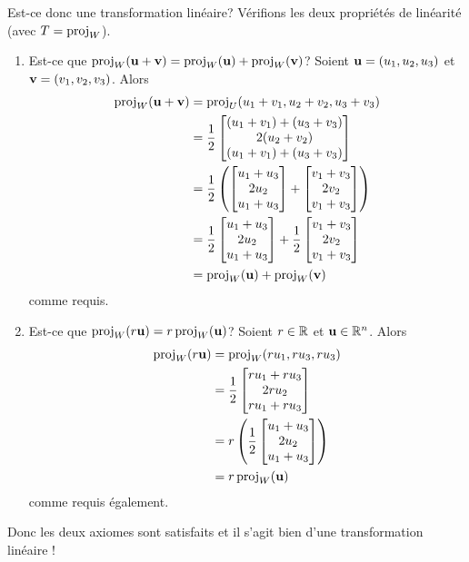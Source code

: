 \begin{myexample}
Est-ce donc une transformation linéaire?  Vérifions les deux propriétés de
linéarité (avec $T = \proj_W$).
\begin{enumerate}
\item Est-ce que $\proj_W(\uu + \vv) = \proj_W(\uu) + \proj_W(\vv)$? Soient $\uu = (u_1, u_2, u_3)$ et $\vv = (v_1, v_2, v_3)$. Alors
\begin{align*}
\proj_W(\uu + \vv) &= \proj_U(u_1+v_1,u_2+v_2,u_3+v_3) \\
&= \frac12\mat{ (u_1+v_1) + (u_3+v_3)\\ 2(u_2+v_2)\\  (u_1+v_1) + (u_3+v_3)}\\
&= \frac12\left( \mat{u_1+u_3\\2u_2\\u_1+u_3} + \mat{v_1+v_3\\2v_2\\v_1+v_3}\right) \\
&= \frac12\mat{u_1+u_3\\2u_2\\u_1+u_3} + \frac12\mat{v_1+v_3\\2v_2\\v_1+v_3}\\
&= \proj_W(\uu) + \proj_W(\vv)
\end{align*}
comme requis.
\item Est-ce que $\proj_W(r\uu) = r\proj_W(\uu)$?  Soient $r\in \R$ et $\uu\in\R^n$.
Alors
\begin{align*}
\proj_W(r\uu) &= \proj_W(ru_1,ru_3,ru_3)\\
&= \frac12\mat{ru_1+ru_3\\ 2ru_2 \\ ru_1+ru_3}\\
&= r\left(\frac12\mat{u_1+u_3\\ 2u_2 \\ u_1+u_3}\right)\\
&= r\proj_W(\uu)
\end{align*}
comme requis également.
\end{enumerate}
Donc les deux axiomes sont satisfaits et il s'agit bien d'une transformation linéaire !
\end{myexample}

